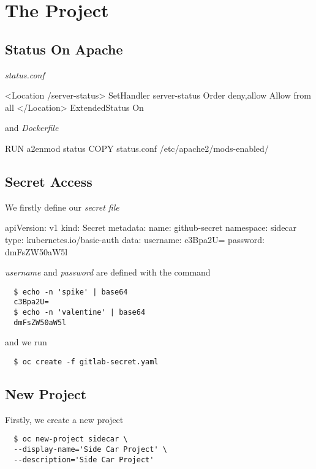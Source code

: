 \section{The Project}

\subsection{Status On Apache}

\emph{status.conf}
\begin{apachecode*}{}
  <Location /server-status>
  SetHandler server-status
  Order deny,allow
  Allow from all
  </Location> ExtendedStatus On
\end{apachecode*}

and  \emph{Dockerfile}

\begin{dockercode*}{}
  RUN a2enmod status
  COPY status.conf /etc/apache2/mods-enabled/
\end{dockercode*}

\subsection{Secret Access}

We firstly define our \emph{secret file}

\begin{yamlcode*}{}
  apiVersion: v1
  kind: Secret
  metadata:
  name: github-secret
  namespace: sidecar
  type: kubernetes.io/basic-auth
  data:
  username: c3Bpa2U=
  password: dmFsZW50aW5l
\end{yamlcode*}

\emph{username} and \emph{password} are defined with the command

\begin{verbatim}
  $ echo -n 'spike' | base64
  c3Bpa2U=
  $ echo -n 'valentine' | base64
  dmFsZW50aW5l
\end{verbatim}

and we run

\begin{verbatim}
  $ oc create -f gitlab-secret.yaml
\end{verbatim}

\subsection{New Project}

Firstly, we create a new project

\begin{verbatim}
  $ oc new-project sidecar \
  --display-name='Side Car Project' \
  --description='Side Car Project'
\end{verbatim}

